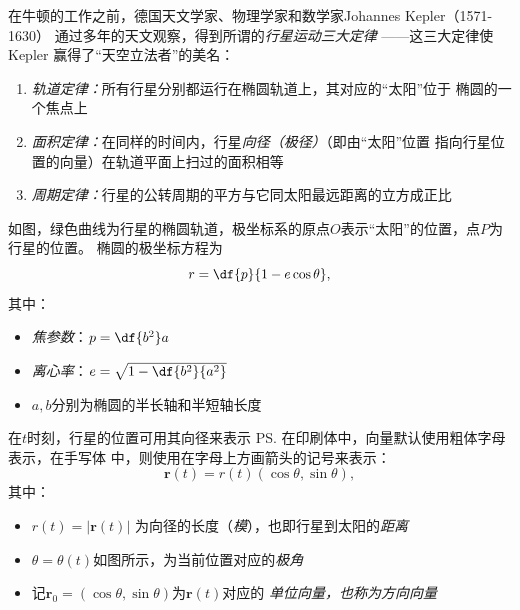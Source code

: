 \begin{shaded}
	在牛顿的工作之前，德国天文学家、物理学家和数学家Johannes Kepler（1571-1630）
	通过多年的天文观察，得到所谓的{\it 行星运动三大定律}
	——这三大定律使Kepler
	赢得了“天空立法者”的美名：
	\begin{enumerate}
		\setlength{\itemindent}{2em}
	  \item {\it 轨道定律：}所有行星分别都运行在椭圆轨道上，其对应的“太阳”位于
	  椭圆的一个焦点上
	  \item {\it 面积定律：}在同样的时间内，行星{\it 向径（极径）}（即由“太阳”位置
	  指向行星位置的向量）在轨道平面上扫过的面积相等
	  \item {\it 周期定律：}行星的公转周期的平方与它同太阳最远距离的立方成正比 
	\end{enumerate}
	\begin{center}
	\end{center}
	如图，绿色曲线为行星的椭圆轨道，极坐标系的原点$O$表示“太阳”的位置，点$P$为行星的位置。
	椭圆的极坐标方程为
	$$r=\df{p}{1-e\cos\theta},$$
	其中：
	\begin{itemize}
		\setlength{\itemindent}{2em}
	  \item {\it 焦参数}：$p=\df{b^2}a$
	  \item {\it 离心率}：$e=\sqrt{1-\df{b^2}{a^2}}$
	  \item $a,b$分别为椭圆的半长轴和半短轴长度
	\end{itemize}
	
	在$t$时刻，行星的位置可用其向径来表示
	\ps{在印刷体中，向量默认使用粗体字母表示，在手写体
	中，则使用在字母上方画箭头的记号来表示}：
	$$\bm{r}(t)=r(t)(\cos\theta,\sin\theta),$$
	其中：
	\begin{itemize}
		\setlength{\itemindent}{2em}
	  \item $r(t)=|\bm{r}(t)|$
	  为向径的长度（{\it 模}），也即行星到太阳的{\it 距离}
	  \item $\theta=\theta(t)$如图所示，为当前位置对应的{\it 极角}
	  \item 记$\bm{r}_0=(\cos\theta,\sin\theta)$为$\bm{r}(t)$对应的
	  {\it 单位向量，也称为方向向量}
	\end{itemize}
	

\end{shaded}
